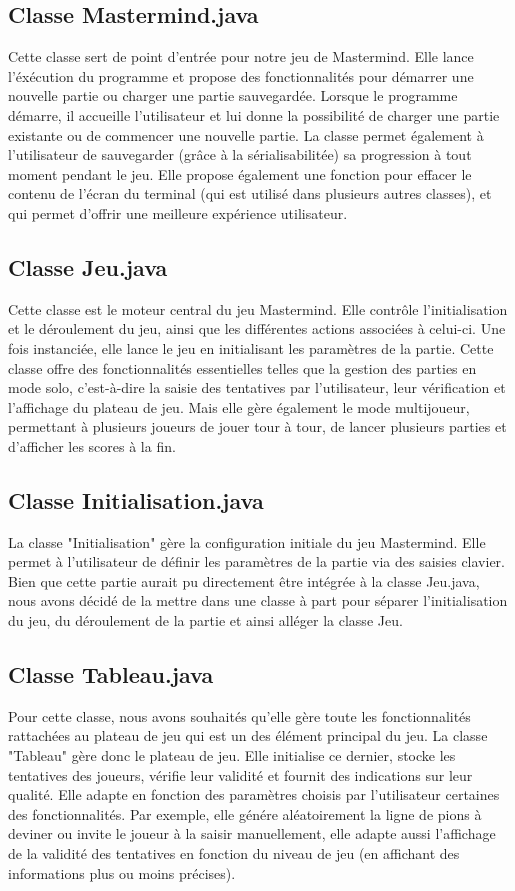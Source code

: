 \documentclass[french]{article}
\begin{document}
\subsection{Classe Mastermind.java}
Cette classe sert de point d'entrée pour notre jeu de Mastermind. Elle lance l'éxécution du programme et propose des fonctionnalités pour démarrer une nouvelle partie ou charger une partie sauvegardée. Lorsque le programme démarre, il accueille l'utilisateur et lui donne la possibilité de charger une partie existante ou de commencer une nouvelle partie. La classe permet également à l'utilisateur de sauvegarder (grâce à la sérialisabilitée) sa progression à tout moment pendant le jeu. Elle propose également une fonction pour effacer le contenu de l'écran du terminal (qui est utilisé dans plusieurs autres classes), et qui permet d'offrir une meilleure expérience utilisateur.

\subsection{Classe Jeu.java}
Cette classe est le moteur central du jeu Mastermind. Elle contrôle l'initialisation et le déroulement du jeu, ainsi que les différentes actions associées à celui-ci. Une fois instanciée, elle lance le jeu en initialisant les paramètres de la partie. Cette classe offre des fonctionnalités essentielles telles que la gestion des parties en mode solo, c'est-à-dire la saisie des tentatives par l'utilisateur, leur vérification et l'affichage du plateau de jeu. Mais elle gère également le mode multijoueur, permettant à plusieurs joueurs de jouer tour à tour, de lancer plusieurs parties et d'afficher les scores à la fin.

\subsection{Classe Initialisation.java}
La classe "Initialisation" gère la configuration initiale du jeu Mastermind. Elle permet à l'utilisateur de définir les paramètres de la partie via des saisies clavier. Bien que cette partie aurait pu directement être intégrée à la classe Jeu.java, nous avons décidé de la mettre dans une classe à part pour séparer l'initialisation du jeu, du déroulement de la partie et ainsi alléger la classe Jeu.

\subsection{Classe Tableau.java}
Pour cette classe, nous avons souhaités qu'elle gère toute les fonctionnalités rattachées au plateau de jeu qui est un des élément principal du jeu. La classe "Tableau" gère donc le plateau de jeu. Elle initialise ce dernier, stocke les tentatives des joueurs, vérifie leur validité et fournit des indications sur leur qualité. Elle adapte en fonction des paramètres choisis par l'utilisateur certaines des fonctionnalités. Par exemple, elle génére aléatoirement la ligne de pions à deviner ou invite le joueur à la saisir manuellement, elle adapte aussi l'affichage de la validité des tentatives en fonction du niveau de jeu (en affichant des informations plus ou moins précises).
\end{document}
